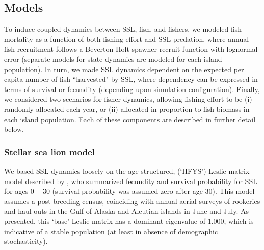 \documentclass[nonumbib,leqno]{nrc1}
\begin{document}
\subsection{Models}


To induce coupled dynamics between SSL, fish, and fishers, we modeled
fish mortality as a function of both fishing effort and SSL predation, where annual fish recruitment follows a Beverton-Holt spawner-recruit function \citep{Beverton1957} with lognormal error (separate models for state dynamics are modeled for each island population).  In turn, we made SSL dynamics dependent on the expected per capita number of fish ``harvested" by SSL, where dependency can be expressed in terms of survival or fecundity (depending upon simulation configuration).  Finally, we considered two scenarios for fisher dynamics, allowing fishing effort to be (i) randomly allocated each year, or (ii) allocated in proportion to fish biomass in each island population.  Each of these components are described in further detail below.


\subsubsection{Stellar sea lion model}

We based SSL dynamics loosely on the age-structured, (`HFYS') Leslie-matrix model described by \citet{HolmesEtAl2007}, who summarized fecundity and survival probability for SSL for ages $0-30$ (survival probability was assumed zero after age 30).  This model assumes a post-breeding census, coinciding with annual aerial surveys of rookeries and haul-outs in the Gulf of Alaska and Aleutian islands in June and July.  As presented, this `base' Leslie-matrix has a dominant eigenvalue of 1.000, which is indicative of a stable population (at least in absence of demographic stochasticity).
\end{document}
